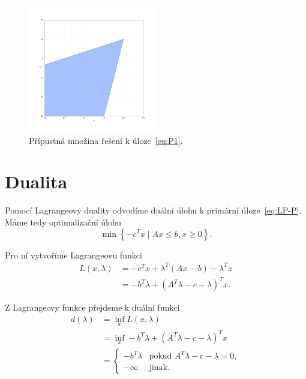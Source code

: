 \begin{figure}[h!]
    \centering
    \includegraphics[width=0.5\textwidth]{img/ex1.png}   
    \caption{Přípustná množina řešení k úloze~\ref{eq:P1}.}
    \label{fig:ex1}
\end{figure}

\section{Dualita}

Pomocí Lagrangeovy duality odvodíme duální úlohu k primární úloze~\ref{eq:LP-P}. Máme tedy optimalizační úlohu
\begin{equation*}
    \min \left\{ -c^Tx \mid Ax \leq b, x \geq 0 \right\}.
\end{equation*}

\noindent Pro ní vytvoříme Lagrangeovu funkci
\begin{equation*}
    \begin{split}
        L(x, \lambda) &= -c^Tx + \lambda^T \left( Ax - b \right) - \lambda^Tx \\
                      &= -b^T\lambda + \left( A^T\lambda - c - \lambda \right)^Tx.
    \end{split}
\end{equation*}

\noindent Z Lagrangeovy funkce přejdeme k duální funkci
\begin{equation*}
    \begin{split}
        d(\lambda)  &= \inf_x L(x, \lambda) \\
                    &= \inf_x -b^T\lambda + \left( A^T\lambda - c - \lambda \right)^Tx \\
                    &=
                    \begin{cases}
                        -b^T\lambda & \text{pokud } A^T\lambda - c - \lambda = 0, \\
                        -\infty     & \text{jinak}.
                    \end{cases}
    \end{split}
\end{equation*}

